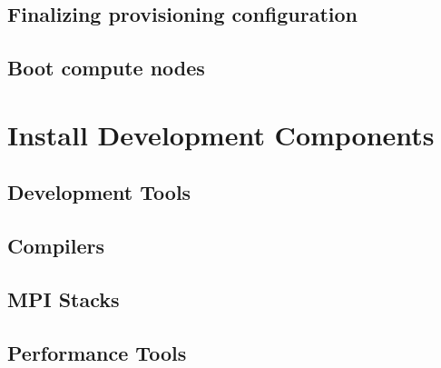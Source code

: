 \documentclass[letterpaper]{article}
\begin{document}
\subsection{Finalizing provisioning configuration} \label{sec:assemble_bootstrap}





\subsection{Boot compute nodes} \label{sec:boot_computes}
 

\section{Install \OHPC{} Development Components}


\vspace*{-0.15cm}
\subsection{Development Tools} \label{sec:install_dev_tools}


\vspace*{-0.15cm}
\subsection{Compilers} \label{sec:install_compilers}


\subsection{MPI Stacks} \label{sec:mpi}


\subsection{Performance Tools} \label{sec:install_perf_tools}

\end{document}

